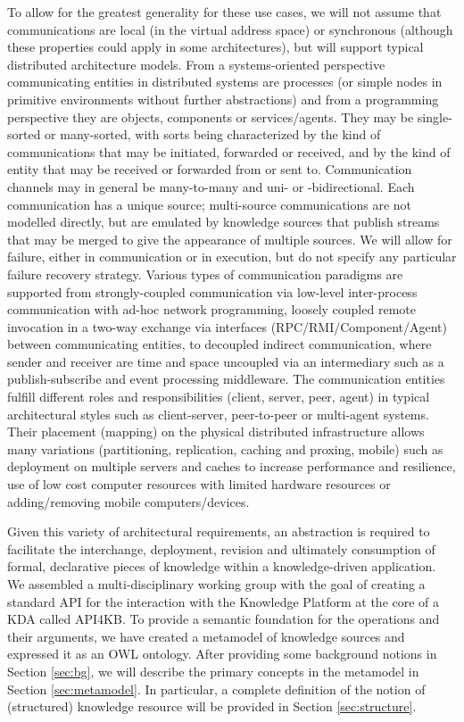 \documentclass[runningheads]{llncs}
\begin{document}
To allow for the greatest generality for these use cases, we will not assume that communications are local (in the virtual address space) or synchronous (although these properties could apply in some architectures), but will support typical distributed architecture models.  
From a systems-oriented perspective communicating entities in distributed systems are processes (or simple nodes in primitive environments without further abstractions) and from a programming perspective they are objects, components or services/agents. They may be single-sorted or many-sorted, with sorts being characterized by the kind of communications that may be initiated, forwarded or received, and by the kind of entity that may be received or forwarded from or sent to.
Communication channels may in general be many-to-many and uni- or -bidirectional. Each communication has a unique source; multi-source communications are not modelled directly, but are emulated by knowledge sources that publish streams that may be merged to give the appearance of multiple sources. We will allow for failure, either in communication or in execution, but do not specify any particular failure recovery strategy. 
Various types of communication paradigms are supported from strongly-coupled communication via low-level inter-process communication with ad-hoc network programming, loosely coupled remote invocation in a two-way exchange via interfaces  (RPC/RMI/Component/Agent) between communicating entities, to decoupled indirect communication, where sender and receiver are time and space uncoupled via an intermediary such as a publish-subscribe and event processing middleware.
The communication entities fulfill different roles and responsibilities (client, server, peer, agent) in typical architectural styles such as client-server, peer-to-peer or multi-agent systems. Their placement (mapping) on the physical distributed infrastructure allows many variations (partitioning, replication, caching and proxing, mobile) such as deployment on multiple servers and caches to increase performance and resilience, use of low cost computer resources with limited hardware resources or adding/removing mobile computers/devices.

Given this variety of architectural requirements, an abstraction is required to facilitate the interchange, deployment, revision and ultimately consumption of formal, declarative pieces of knowledge within a knowledge-driven application. We assembled a multi-disciplinary working group with the goal of creating a standard API for the interaction with the Knowledge Platform at the core of a KDA called API4KB. %
To provide a semantic foundation for the operations and their arguments, we have created a metamodel of knowledge sources and expressed it as an OWL ontology.
After providing some background notions in Section \ref{sec:bg}, we will describe the primary concepts in the metamodel in Section \ref{sec:metamodel}. In particular, a complete definition of the notion of (structured) knowledge resource will be provided in Section \ref{sec:structure}. 
\end{document}
